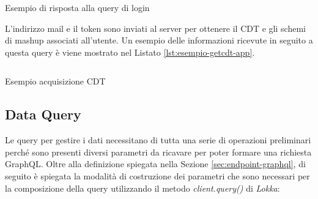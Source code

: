 \begin{listing}[H]
	\inputminted{json}{6-implementazione-app/Codice/esempio-login-app.json}
	\caption{Esempio di risposta alla query di login}
	\label{lst:esempio-login-app}
\end{listing}

L'indirizzo mail e il token sono inviati al server per ottenere il CDT e gli schemi di mashup associati all'utente. Un esempio delle informazioni ricevute in seguito a questa query è viene mostrato nel Listato \ref{lst:esempio-getcdt-app}.

\begin{listing}[H]
	\inputminted{json}{6-implementazione-app/Codice/get-cdt-app.json}
	\caption{Esempio acquisizione CDT}
	\label{lst:esempio-getcdt-app}
\end{listing}

\subsection{Data Query} \label{sec:data-query}

Le query per gestire i dati necessitano di tutta una serie di operazioni preliminari perché sono presenti diversi parametri da ricavare per poter formare una richiesta GraphQL. Oltre alla definizione spiegata nella Sezione \ref{sec:endpoint-graphql}, di seguito è spiegata la modalità di costruzione dei parametri che sono necessari per la composizione della query utilizzando il metodo \emph{client.query()} di \emph{Lokka}:

